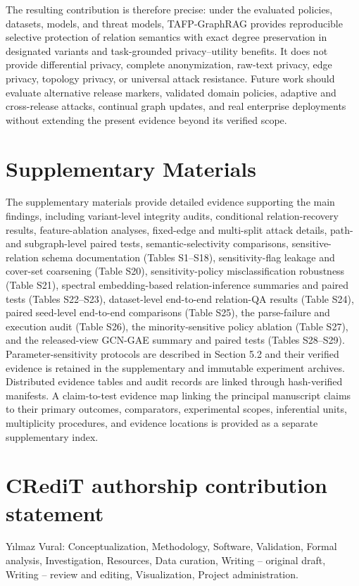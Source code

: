 \documentclass[preprint,12pt]{elsarticle}
\begin{document}
The resulting contribution is therefore precise: under the evaluated policies, datasets, models, and threat models, TAFP-GraphRAG provides reproducible selective protection of relation semantics with exact degree preservation in designated variants and task-grounded privacy--utility benefits. It does not provide differential privacy, complete anonymization, raw-text privacy, edge privacy, topology privacy, or universal attack resistance. Future work should evaluate alternative release markers, validated domain policies, adaptive and cross-release attacks, continual graph updates, and real enterprise deployments without extending the present evidence beyond its verified scope.

\section*{Supplementary Materials}
The supplementary materials provide detailed evidence supporting the main findings, including variant-level integrity audits, conditional relation-recovery results, feature-ablation analyses, fixed-edge and multi-split attack details, path- and subgraph-level paired tests, semantic-selectivity comparisons, sensitive-relation schema documentation (Tables S1--S18), sensitivity-flag leakage and cover-set coarsening (Table S20), sensitivity-policy misclassification robustness (Table S21), spectral embedding-based relation-inference summaries and paired tests (Tables S22--S23), dataset-level end-to-end relation-QA results (Table S24), paired seed-level end-to-end comparisons (Table S25), the parse-failure and execution audit (Table S26), the minority-sensitive policy ablation (Table S27), and the released-view GCN-GAE summary and paired tests (Tables S28--S29). Parameter-sensitivity protocols are described in Section 5.2 and their verified evidence is retained in the supplementary and immutable experiment archives. Distributed evidence tables and audit records are linked through hash-verified manifests. A claim-to-test evidence map linking the principal manuscript claims to their primary outcomes, comparators, experimental scopes, inferential units, multiplicity procedures, and evidence locations is provided as a separate supplementary index.

\section*{CRediT authorship contribution statement}
Y{\i}lmaz Vural: Conceptualization, Methodology, Software, Validation, Formal analysis, Investigation, Resources, Data curation, Writing -- original draft, Writing -- review and editing, Visualization, Project administration.
\end{document}
